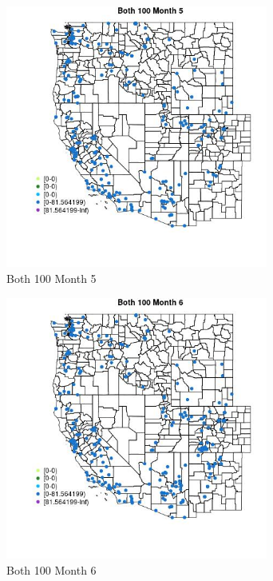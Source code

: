 \begin{figure} 
\centering  
\includegraphics[width=0.77\textwidth]{Code_Outputs/Report_ML_input_PM25_Step4_part_e_de_duplicated_aveswNAs_MapObsMo5Both_100.jpg} 
\caption{\label{fig:Report_ML_input_PM25_Step4_part_e_de_duplicated_aveswNAsMapObsMo5Both_100}Both 100 Month 5} 
\end{figure} 
 

\begin{figure} 
\centering  
\includegraphics[width=0.77\textwidth]{Code_Outputs/Report_ML_input_PM25_Step4_part_e_de_duplicated_aveswNAs_MapObsMo6Both_100.jpg} 
\caption{\label{fig:Report_ML_input_PM25_Step4_part_e_de_duplicated_aveswNAsMapObsMo6Both_100}Both 100 Month 6} 
\end{figure} 
 

